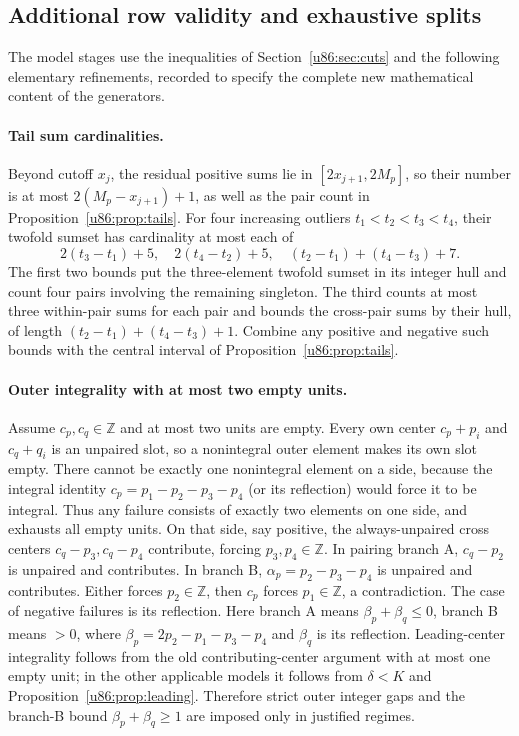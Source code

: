 \documentclass[11pt,a4paper]{article}
\theoremstyle{remark}
\newcommand{\Z}{\mathbb Z}
\begin{document}
\subsection{Additional row validity and exhaustive splits}
The model stages use the inequalities of Section~\ref{u86:sec:cuts} and the
following elementary refinements, recorded to specify the complete new
mathematical content of the generators.

\paragraph{Tail sum cardinalities.}
Beyond cutoff $x_j$, the residual positive sums lie in
$[2x_{j+1},2M_p]$, so their number is at most
$2(M_p-x_{j+1})+1$, as well as the pair count in
Proposition~\ref{u86:prop:tails}. For four increasing outliers
$t_1<t_2<t_3<t_4$, their twofold sumset has cardinality at most each of
\[
 2(t_3-t_1)+5,\quad2(t_4-t_2)+5,\quad
 (t_2-t_1)+(t_4-t_3)+7.
\]
The first two bounds put the three-element twofold sumset in its integer
hull and count four pairs involving the remaining singleton. The third
counts at most three within-pair sums for each pair and bounds the
cross-pair sums by their hull, of length
$(t_2-t_1)+(t_4-t_3)+1$. Combine any positive and negative such bounds
with the central interval of Proposition~\ref{u86:prop:tails}.

\paragraph{Outer integrality with at most two empty units.}
Assume $c_p,c_q\in\Z$ and at most two units are empty. Every own center
$c_p+p_i$ and $c_q+q_i$ is an unpaired slot, so a nonintegral outer
element makes its own slot empty. There cannot be exactly one
nonintegral element on a side, because the integral identity
$c_p=p_1-p_2-p_3-p_4$ (or its reflection) would force it to be integral.
Thus any failure consists of exactly two elements on one side, and
exhausts all empty units. On that side, say positive, the always-unpaired
cross centers $c_q-p_3,c_q-p_4$ contribute, forcing $p_3,p_4\in\Z$.
In pairing branch A, $c_q-p_2$ is unpaired and contributes. In branch B,
$\alpha_p=p_2-p_3-p_4$ is unpaired and contributes. Either forces
$p_2\in\Z$, then $c_p$ forces $p_1\in\Z$, a contradiction.
The case of negative failures is its reflection.
Here branch A means $\beta_p+\beta_q\le0$, branch B means $>0$, where
$\beta_p=2p_2-p_1-p_3-p_4$ and $\beta_q$ is its reflection.
Leading-center integrality follows from the old contributing-center
argument with at most one empty unit; in the other applicable models it
follows from $\delta<K$ and Proposition~\ref{u86:prop:leading}. Therefore
strict outer integer gaps and the branch-B bound $\beta_p+\beta_q\ge1$
are imposed only in justified regimes.
\end{document}
